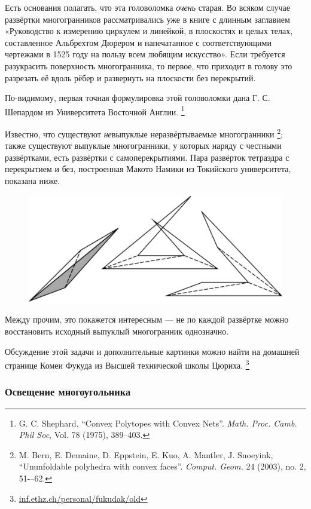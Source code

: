 Есть основания полагать, что эта головоломка \emph{очень} старая. 
Во всяком случае развёртки многогранников рассматривались уже в книге с длинным заглавием «Руководство к измерению циркулем и линейкой, в плоскостях и целых телах, составленное Альбрехтом Дюрером и напечатанное с соответствующими чертежами в 1525 году на пользу всем любящим искусство».
Если требуется разукрасить поверхность многогранника, то первое, что приходит в голову это разрезать её вдоль рёбер и развернуть на плоскости без перекрытий.

По-видимому, первая точная формулировка этой головоломки дана Г. С. Шепардом из Университета Восточной Англии.%
\footnote{G. C. Shephard, ``Convex Polytopes with Convex Nets''. \emph{Math. Proc. Camb. Phil Soc}, Vol. 78 (1975), 389--403.}
 
Известно, что существуют \emph{не}выпуклые неразвёртываемые многогранники%
\footnote{M. Bern, E. Demaine, D. Eppstein, E. Kuo, A. Mantler, J. Snoeyink, 
``Ununfoldable polyhedra with convex faces''.
\emph{Comput. Geom.} 24 (2003), no. 2, 51-–62.};
также существуют выпуклые многогранники, у которых наряду с честными развёртками, есть развёртки с самоперекрытиями. 
Пара развёрток тетраэдра с перекрытием и без, построенная Макото Намики из Токийского университета, показана ниже.

\begin{figure}[h!]
\centering
\includegraphics[scale=0.5]{Figs/UnsolvedPuzzles/unfold}
\end{figure}

Между прочим, это покажется интересным --- не по каждой развёртке можно восстановить исходный выпуклый многогранник однозначно. %

Обсуждение этой задачи и дополнительные картинки можно найти на домашней странице Комеи Фукуда из Высшей технической школы Цюриха.%
\footnote{\href{https://inf.ethz.ch/personal/fukudak/old/}{\url{inf.ethz.ch/personal/fukudak/old}}}

\subsubsection*{Освещение многоугольника}

